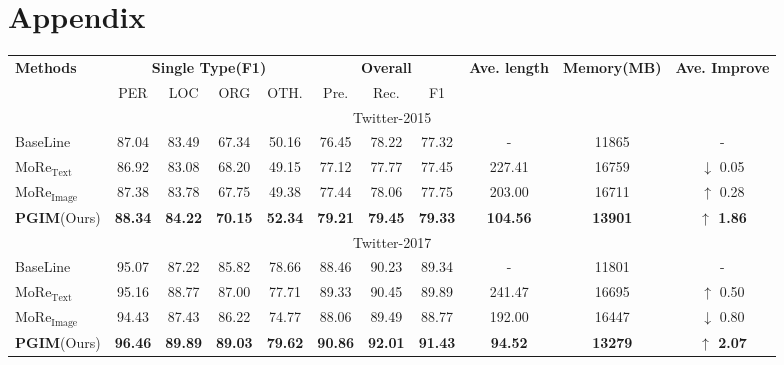 \documentclass[11pt]{article}
\begin{document}
\appendix

\section{Appendix}
\label{sec:appendix}


\begin{table*}[!]
\small
\setlength\tabcolsep{5pt}
\renewcommand{\arraystretch}{1.2}
\centering
\begin{tabular}{lcccc|ccc|c|c|c}
\toprule
 \multirow{2}{*}{\textbf{Methods}} 
 & \multicolumn{4}{|c|}{\textbf{Single Type(F1)}} & \multicolumn{3}{c|}{\textbf{Overall}} & \multirow{2}{*}{\textbf{Ave. length}}  &\multirow{2}{*}{\textbf{Memory(MB)}} &\multirow{2}{*}{\textbf{Ave. Improve}} \\
  &\multicolumn{1}{|c}{PER}   & LOC   & ORG  & \multicolumn{1}{c|}{OTH.}  & Pre.   & Rec.   & \multicolumn{1}{c|}{F1}  &&  \\ 
\midrule 
 \multicolumn{11}{c}{Twitter-2015}\\
\midrule
BaseLine &\multicolumn{1}{|c}{87.04} & 83.49 & 67.34 & \multicolumn{1}{c|}{50.16} & 76.45 & 78.22 & \multicolumn{1}{c|}{77.32} & - & 11865 & - \\\midrule
MoRe$_{\text{Text}}$ &\multicolumn{1}{|c}{86.92} & 83.08 & 68.20 & \multicolumn{1}{c|}{49.15} & 77.12 & 77.77 & \multicolumn{1}{c|}{77.45} & 227.41 & 16759 & $\downarrow$ 0.05  \\
MoRe$_{\text{Image}}$ &\multicolumn{1}{|c}{87.38} & 83.78 & 67.75 & \multicolumn{1}{c|}{49.38} & 77.44 & 78.06 & \multicolumn{1}{c|}{77.75} & 203.00 & 16711 & $\uparrow$ 0.28 \\
\textbf{PGIM}(Ours)  &\multicolumn{1}{|c}{\textbf{88.34}} & \textbf{84.22} & \textbf{70.15} & \multicolumn{1}{c|}{\textbf{52.34}} & \textbf{79.21} & \textbf{79.45} & \multicolumn{1}{c|}{\textbf{79.33}} & \textbf{104.56} & \textbf{13901} & \textbf{$\uparrow$ 1.86} \\
\midrule 
\multicolumn{11}{c}{Twitter-2017}\\
\midrule
BaseLine &\multicolumn{1}{|c}{95.07} & 87.22 & 85.82 & \multicolumn{1}{c|}{78.66} & 88.46  & 90.23 &  \multicolumn{1}{c|}{89.34} & - & 11801 & -  \\\midrule
MoRe$_{\text{Text}}$ &\multicolumn{1}{|c}{95.16} & 88.77 & 87.00 & \multicolumn{1}{c|}{77.71} & 89.33 & 90.45 & \multicolumn{1}{c|}{89.89} & 241.47 & 16695 & $\uparrow$ 0.50 \\
MoRe$_{\text{Image}}$ &\multicolumn{1}{|c}{94.43} & 87.43 & 86.22 & \multicolumn{1}{c|}{74.77} & 88.06 & 89.49 & \multicolumn{1}{c|}{88.77} & 192.00 & 16447 & $\downarrow$ 0.80 \\
\textbf{PGIM}(Ours)  &\multicolumn{1}{|c}{\textbf{96.46}} & \textbf{89.89} & \textbf{89.03} & \multicolumn{1}{c|}{\textbf{79.62}} & \textbf{90.86} & \textbf{92.01} & \multicolumn{1}{c|}{\textbf{91.43}} & \textbf{94.52} & \textbf{13279}  & \textbf{$\uparrow$ 2.07}\\


\end{tabular}
\end{table*}
\end{document}
